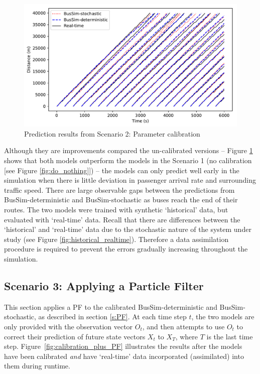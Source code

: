\begin{figure}[htb]
    \centering
    \includegraphics[width=1\textwidth]{Figures/Fig_calibration_IncreaseRate_7.pdf}
    \caption{Prediction results from Scenario 2: Parameter calibration}
    \label{fig:calibration}
\end{figure}

Although they are improvements compared the un-calibrated versions -- Figure \ref{fig:calibration} shows that both models outperform the models in the Scenario 1 (no calibration [see Figure \ref{fig:do_nothing}]) -- the models can only predict well early in the simulation when there is little deviation in passenger arrival rate and surrounding traffic speed. There are large observable gaps between the predictions from BusSim-deterministic and BusSim-stochastic as buses reach the end of their routes. The two models were trained with synthetic `historical' data, but evaluated with `real-time' data. Recall that there are differences between the `historical' and `real-time' data due to the stochastic nature of the system under study (see Figure \ref{fig:historical_realtime}). Therefore a data assimilation procedure is required to prevent the errors gradually increasing throughout the simulation.

\subsection{Scenario 3: Applying a Particle Filter}

This section applies a PF to the calibrated BusSim-deterministic and BusSim-stochastic, as described in section \ref{s:PF}. At each time step $t$, the two models are only provided with the observation vector $O_t$, and then attempts to use $O_t$ to correct their prediction of future state vectors $X_t$ to $X_T$, where $T$ is the last time step. Figure~\ref{fig:calibration_plus_PF} illustrates the results after the models have been calibrated \textit{and} have `real-time' data incorporated (assimilated) into them during runtime.

